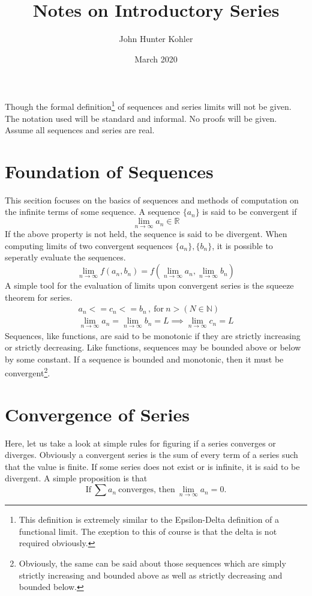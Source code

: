 \documentclass[11pt]{scrreprt}
\title{Notes on Introductory Series}
\author{John Hunter Kohler}
\date{March 2020}
\newcommand{\inreal}{\in\mathbb{R}}
\newcommand{\innat}{\in\mathbb{N}}
\begin{document}
\maketitle

\quad Though the formal definition\footnote{This definition is extremely similar to the Epsilon-Delta definition of a functional limit. The exeption 
to this of course is that the delta is not required obviously.} of sequences and series limits will not be given. 
The notation used will be standard and informal. No proofs will be given. Assume all sequences and series are real.

\section*{Foundation of Sequences}
	This secition focuses on the basics of sequences and methods of computation on the infinite terms of some sequence. 
	A sequence $\{a_n\}$ is said to be convergent if
		\begin{equation}
			\lim_{n\to\infty} a_n \inreal
		\end{equation}
	If the above property is not held, the sequence is said to be divergent. When computing limits of two 
	convergent sequences $\{a_n\},\{b_n\}$, it is possible to seperatly evaluate the sequences.
		\begin{equation}
			\lim_{n\to\infty} f(a_n,b_n) = f(\lim_{n\to\infty} a_n, \lim_{n\to\infty} b_n)
		\end{equation}
	A simple tool for the evaluation of limits upon convergent series is the squeeze theorem for series.
		\begin{gather}
			a_n <= c_n <= b_n\,,\ \text{for} \ n > (N\innat) \\ 
			\lim_{n\to\infty} a_n = \lim_{n\to\infty} b_n = L
			\implies \lim_{n\to\infty} c_n = L
		\end{gather}
	Sequences, like functions, are said to be monotonic if they are strictly increasing or strictly decreasing.
	Like functions, sequences may be bounded above or below by some constant. If a sequence is bounded and monotonic, 
	then it must be convergent\footnote{Obviously, the same can be said about those sequences which are simply strictly increasing and 
	bounded above as well as strictly decreasing and bounded below.}.

\section*{Convergence of Series}
	Here, let us take a look at simple rules for figuring if a series converges or diverges. Obviously a convergent series is the sum of
	every term of a series such that the value is finite. If some series does not exist or is infinite, it is said to be divergent.
	A simple proposition is that
		\begin{equation}
			\text{If} \ \sum a_n \ \text{converges, then} \ \lim_{n\to\infty} a_n = 0.
		\end{equation}
\end{document}
